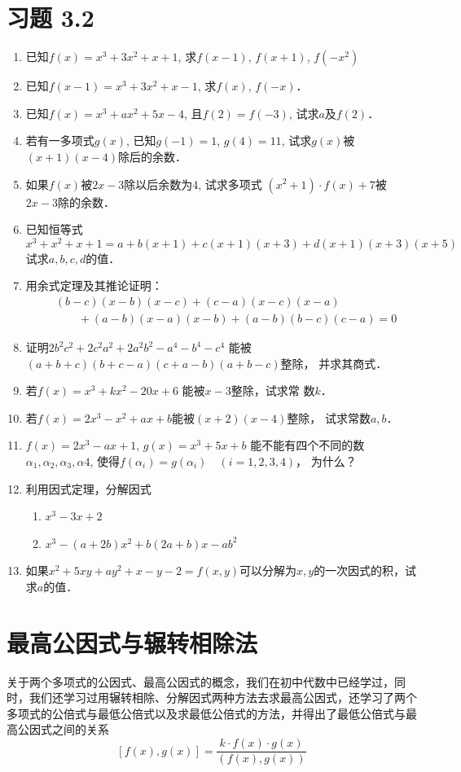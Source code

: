 \section*{习题 3.2}
\begin{enumerate}
    \item 
已知$f(x)=x^3+3x^2+x+1$, 求$f(x-1)$, $f(x+1)$, $f (-x^2)$
\item 已知$f(x-1)=x^3+3x^2+x-1$, 求$f(x)$, $f(-x)$．
\item 已知$f(x)=x^3+ax^2+5x-4$, 且$f(2)=f(-3)$, 试求$a$及$f(2)$．
\item 若有一多项式$g(x)$, 已知$g(-1)=1$, $g(4)=11$, 试求$g(x)$被$(x+1)(x-4)$除后的余数．

\item 如果$f(x)$被$2x-3$除以后余数为4, 试求多项式
$(x^2+1)\cdot f(x)+7$被$2x-3$除的余数．
\item 已知恒等式
\[x^3+x^2+x+1=a+b (x+1) +c (x+1) (x+3)+d (x+1) (x+3)(x+5)\]
试求$a,b,c,d$的值．
\item 用余式定理及其推论证明：
\[\begin{split}
   & (b-c) (x-b)(x-c)+(c-a)(x-c)(x-a)\\
&\qquad + (a-b) (x-a)(x-b)+(a-b)(b - c)(c-a)=0
\end{split}\]
\item 证明$2b^2c^2+2c^2a^2+2a^2b^2-a^4-b^4-c^4$ 能被$(a+b+c)(b+c-a)(c+a-b)(a+b-c)$整除，
并求其商式．
\item 若$f(x)=x^3+kx^2-20x+6$ 能被$x-3$整除，试求常
数$k$．
\item 若$f(x)=2x^3-x^2+ax+b$能被$(x+2)(x-4)$整除，
试求常数$a,b$．
\item $f(x)=2x^3-ax+1$, $g(x)=x^3+5x+b$ 能不能有四个不同的数$\alpha_1,\alpha_2,\alpha_3,\alpha4$, 使得$f (\alpha_i) =g (\alpha_i)\quad  (i=1,2,3,4)$，
为什么？
\item 利用因式定理，分解因式
\begin{enumerate}
    \item $x^3-3x+2$
    \item $x^3-(a+2b)x^2+b(2a+b)x-ab^2$
\end{enumerate}

\item 如果$x^2+5xy+ay^2+x-y-2=f(x,y)$可以分解为$x,y$的一次因式的积，试求$a$的值．
\end{enumerate}

\section{最高公因式与辗转相除法}
关于两个多项式的公因式、最高公因式的概念，我们在初中代数中已经学过，同时，我们还学习过用辗转相除、分解因式两种方法去求最高公因式，还学习了两个多项式的公倍式与最低公倍式以及求最低公倍式的方法，并得出了最低公倍式与最高公因式之间的关系
\[[f(x),g(x)]=\frac{k\cdot f(x)\cdot g(x)}{(f(x),g(x))}\]

